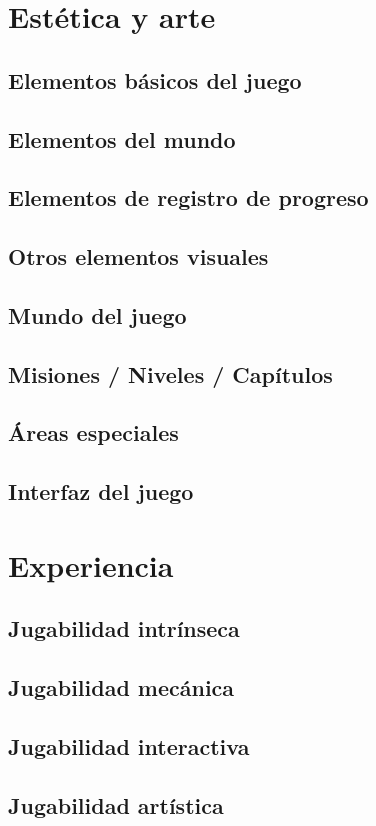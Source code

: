 \section{Estética y arte}
\subsection{Elementos básicos del juego}
\subsection{Elementos del mundo}
\subsection{Elementos de registro de progreso}
\subsection{Otros elementos visuales}
\subsection{Mundo del juego}
\subsection{Misiones / Niveles / Capítulos}
\subsection{Áreas especiales}
\subsection{Interfaz del juego}


\section{Experiencia}
\subsection{Jugabilidad intrínseca}
\subsection{Jugabilidad mecánica}
\subsection{Jugabilidad interactiva}
\subsection{Jugabilidad artística}
